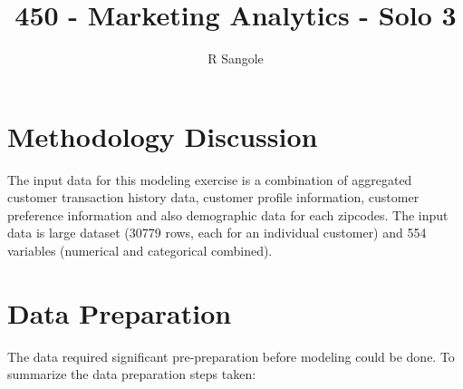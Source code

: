 \documentclass[10pt,]{article}
\title{450 - Marketing Analytics - Solo 3}
\author{R Sangole}
\date{}
\begin{document}
\maketitle

\section{Methodology Discussion}\label{methodology-discussion}

The input data for this modeling exercise is a combination of aggregated
customer transaction history data, customer profile information,
customer preference information and also demographic data for each
zipcodes. The input data is large dataset (30779 rows, each for an
individual customer) and 554 variables (numerical and categorical
combined).

\section{Data Preparation}\label{data-preparation}

The data required significant pre-preparation before modeling could be
done. To summarize the data preparation steps taken:
\end{document}
